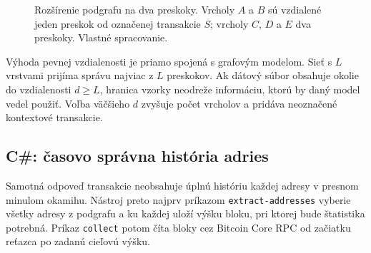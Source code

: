 \begin{figure}[htbp]
  \centering
  \caption{Rozšírenie podgrafu na dva preskoky. Vrcholy $A$ a $B$ sú
  vzdialené jeden preskok od označenej transakcie $S$; vrcholy $C$,
  $D$ a $E$ dva preskoky. Vlastné spracovanie.}
  \label{fig:hop-expansion}
\end{figure}

Výhoda pevnej vzdialenosti je priamo spojená s grafovým modelom. Sieť
s $L$ vrstvami prijíma správu najviac z $L$ preskokov. Ak dátový súbor
obsahuje okolie do vzdialenosti $d\geq L$, hranica vzorky neodreže
informáciu, ktorú by daný model vedel použiť. Voľba väčšieho $d$
zvyšuje počet vrcholov a pridáva neoznačené kontextové transakcie.

\subsection{C\#: časovo správna história adries}

Samotná odpoveď transakcie neobsahuje úplnú históriu každej adresy v
presnom minulom okamihu. Nástroj preto najprv príkazom
\texttt{extract-addresses} vyberie všetky adresy z podgrafu a ku každej
uloží výšku bloku, pri ktorej bude štatistika potrebná. Príkaz
\texttt{collect} potom číta bloky cez Bitcoin Core RPC od začiatku
reťazca po zadanú cieľovú výšku.

